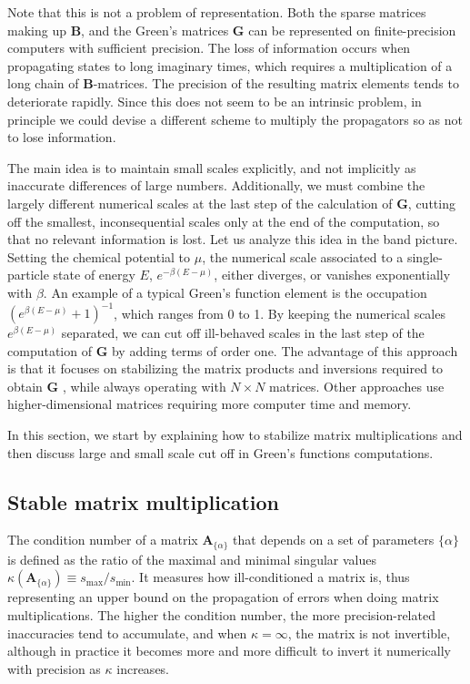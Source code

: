 Note that this is not a problem of representation.
Both the sparse matrices making up $\bm B$, and the Green's matrices $\bm G$ can be represented on finite-precision computers with sufficient precision.
The loss of information occurs when propagating states to long imaginary times, which requires a multiplication of a long chain of $\bm B$-matrices.
The precision of the resulting matrix elements tends to deteriorate rapidly.
Since this does not seem to be an intrinsic problem, in principle we could devise a different scheme to multiply the propagators so as not to lose information.

The main idea is to maintain small scales explicitly, and not implicitly as inaccurate differences of large numbers.
Additionally, we must combine the largely different numerical scales at the last step of the calculation of $\bm G$, cutting off the smallest, inconsequential scales only at the end of the computation, so that no relevant information is lost.
Let us analyze this idea in the band picture.
Setting the chemical potential to $\mu$, the numerical scale associated to a single-particle state of energy $E$, $e^{-\beta ( E - \mu ) }$,  either diverges, or vanishes exponentially with $\beta$.
An example of a typical Green's function element is the occupation $(e^{\beta ( E - \mu ) } + 1 )^{-1}$, which ranges from 0 to 1.
By keeping the numerical scales $e^{\beta ( E - \mu ) }$ separated, we can cut off ill-behaved scales in the last step of the computation of $\bm G$ by adding terms of order one.
The advantage of this approach is that it  focuses on stabilizing the matrix products and inversions required to obtain $\bm G$ \cite{baeriswyl_interacting_2012, feldbacher_efficient_2001, bai_stable_2011}, while always operating with $N \times N$ matrices.
Other approaches \cite{hirsch_stable_1988, white_algorithm_1988} use higher-dimensional matrices requiring more computer time and memory.

In this section, we start by explaining how to stabilize matrix multiplications and then discuss large and small scale cut off in Green's functions computations.

\subsection{Stable matrix multiplication}
\label{subsec:stableMatrixMult}

The condition number of a matrix $\bm A_{ \{\alpha \} }$ that depends on a set of parameters $\{ \alpha \}$ is defined as the ratio of the maximal and minimal singular values $\kappa ( \bm A_{ \{ \alpha \} } ) \equiv s_{\text{max}} /s_{\text{min}}$.
It measures how ill-conditioned a matrix is, thus representing an upper bound on the propagation of errors when doing matrix multiplications.
The higher the condition number, the more precision-related inaccuracies tend to accumulate, and when $\kappa = \infty$, the matrix is not invertible, although in practice it becomes more and more difficult to invert it numerically with precision as $\kappa$ increases.

